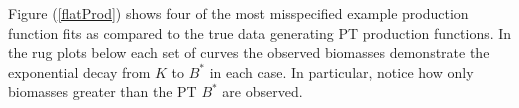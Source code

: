\documentclass[12pt]{article}
\begin{document}
%
Figure (\ref{flatProd}) shows four of the most misspecified example
production function fits as compared to the true data generating PT production
functions. In the rug plots below each set of curves the observed biomasses
demonstrate the exponential decay from $K$ to $B^*$ in each case. In particular,
notice how only biomasses greater than the PT $B^*$ are observed. 
\end{document}
